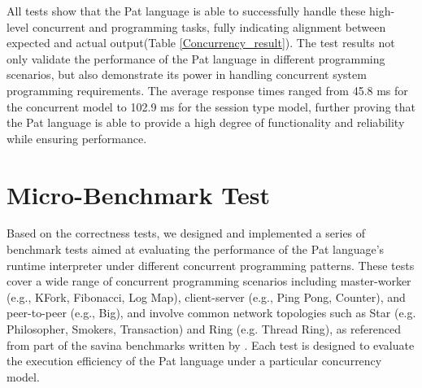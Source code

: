\documentclass{l4proj}
\begin{document}
All tests show that the Pat language is able to successfully handle these high-level concurrent and programming tasks, fully indicating alignment between expected and actual output(Table \ref{Concurrency_result}). The test results not only validate the performance of the Pat language in different programming scenarios, but also demonstrate its power in handling concurrent system programming requirements. The average response times ranged from 45.8 ms for the concurrent model to 102.9 ms for the session type model, further proving that the Pat language is able to provide a high degree of functionality and reliability while ensuring performance.
\begin{table}[ht]
\centering
\renewcommand{\arraystretch}{1.1}
\caption{Advanced concurrency model correct test results}
\label{Concurrency_result}
\end{table}


\section{Micro-Benchmark Test}

Based on the correctness tests, we designed and implemented a series of benchmark tests aimed at evaluating the performance of the Pat language's runtime interpreter under different concurrent programming patterns. These tests cover a wide range of concurrent programming scenarios including master-worker (e.g., KFork, Fibonacci, Log Map), client-server (e.g., Ping Pong, Counter), and peer-to-peer (e.g., Big), and involve common network topologies such as Star (e.g. Philosopher, Smokers, Transaction) and Ring (e.g. Thread Ring), as referenced from part of the savina benchmarks written by \cite{imam_2014_savina}. Each test is designed to evaluate the execution efficiency of the Pat language under a particular concurrency model.
\end{document}

